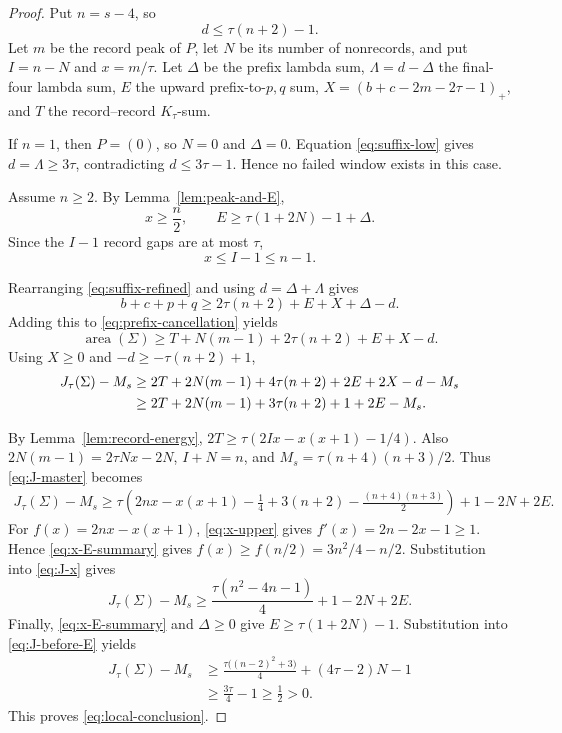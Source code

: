 \documentclass[11pt]{article}
\theoremstyle{definition}
\theoremstyle{remark}
\newcommand{\area}{\operatorname{area}}
\begin{document}
\begin{proof}
Put \(n=s-4\), so
\[
  d\le\tau(n+2)-1.
\]
Let \(m\) be the record peak of \(P\), let \(N\) be its number of
nonrecords, and put \(I=n-N\) and \(x=m/\tau\).  Let \(\Delta\) be the
prefix lambda sum, \(\Lambda=d-\Delta\) the final-four lambda sum, \(E\)
the upward prefix-to-\(p,q\) sum, \(X=(b+c-2m-2\tau-1)_+\), and \(T\)
the record--record \(K_\tau\)-sum.

If \(n=1\), then \(P=(0)\), so \(N=0\) and \(\Delta=0\).  Equation
\eqref{eq:suffix-low} gives \(d=\Lambda\ge3\tau\), contradicting
\(d\le3\tau-1\).  Hence no failed window exists in this case.

Assume \(n\ge2\).  By Lemma~\ref{lem:peak-and-E},
\begin{equation}
  x\ge\frac n2,
  \qquad
  E\ge\tau(1+2N)-1+\Delta.
  \label{eq:x-E-summary}
\end{equation}
Since the \(I-1\) record gaps are at most \(\tau\),
\begin{equation}
  x\le I-1\le n-1.
  \label{eq:x-upper}
\end{equation}

Rearranging \eqref{eq:suffix-refined} and using
\(d=\Delta+\Lambda\) gives
\[
  b+c+p+q\ge2\tau(n+2)+E+X+\Delta-d.
\]
Adding this to \eqref{eq:prefix-cancellation} yields
\begin{equation}
  \area(\Sigma)
  \ge T+N(m-1)+2\tau(n+2)+E+X-d.
  \label{eq:area-master}
\end{equation}
Using \(X\ge0\) and \(-d\ge-\tau(n+2)+1\),
\begin{align}
  J_\tau(\Sigma)-M_s
  &\ge2T+2N(m-1)+4\tau(n+2)+2E+2X-d-M_s\notag\\
  &\ge2T+2N(m-1)+3\tau(n+2)+1+2E-M_s.
  \label{eq:J-master}
\end{align}

By Lemma~\ref{lem:record-energy},
\(2T\ge\tau(2Ix-x(x+1)-1/4)\).  Also
\(2N(m-1)=2\tau Nx-2N\), \(I+N=n\), and
\(M_s=\tau(n+4)(n+3)/2\).  Thus \eqref{eq:J-master} becomes
\begin{align}
  J_\tau(\Sigma)-M_s
  \ge\tau\left(
    2nx-x(x+1)-\frac14+3(n+2)
    -\frac{(n+4)(n+3)}2
  \right)
  +1-2N+2E.
  \label{eq:J-x}
\end{align}
For \(f(x)=2nx-x(x+1)\), \eqref{eq:x-upper} gives
\(f'(x)=2n-2x-1\ge1\).  Hence \eqref{eq:x-E-summary} gives
\(f(x)\ge f(n/2)=3n^2/4-n/2\).  Substitution into \eqref{eq:J-x} gives
\begin{equation}
  J_\tau(\Sigma)-M_s
  \ge
  \frac{\tau(n^2-4n-1)}4+1-2N+2E.
  \label{eq:J-before-E}
\end{equation}
Finally, \eqref{eq:x-E-summary} and \(\Delta\ge0\) give
\(E\ge\tau(1+2N)-1\).  Substitution into
\eqref{eq:J-before-E} yields
\begin{align*}
  J_\tau(\Sigma)-M_s
  &\ge
  \frac{\tau\bigl((n-2)^2+3\bigr)}4
  +(4\tau-2)N-1\\
  &\ge \frac{3\tau}{4}-1
  \ge\frac12>0.
\end{align*}
This proves \eqref{eq:local-conclusion}.
\end{proof}
\end{document}

